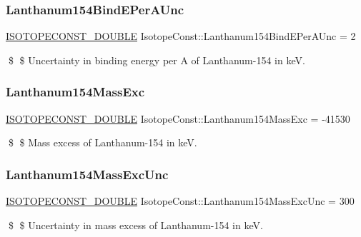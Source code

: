 \subsubsection{\texorpdfstring{Lanthanum154\+Bind\+E\+Per\+A\+Unc}{Lanthanum154BindEPerAUnc}}
{\footnotesize\ttfamily \mbox{\hyperlink{group___isotope_const-_macros_ga8f45a7272ce02c0b4c65c44636ed719a}{I\+S\+O\+T\+O\+P\+E\+C\+O\+N\+S\+T\+\_\+\+D\+O\+U\+B\+LE}} Isotope\+Const\+::\+Lanthanum154\+Bind\+E\+Per\+A\+Unc = 2}

\$ \$ Uncertainty in binding energy per A of Lanthanum-\/154 in keV. \mbox{\label{group___isotope_const-_lanthanum-_la154_ga7b0326944bf7e463cd8969642f48c71a}} 
\subsubsection{\texorpdfstring{Lanthanum154\+Mass\+Exc}{Lanthanum154MassExc}}
{\footnotesize\ttfamily \mbox{\hyperlink{group___isotope_const-_macros_ga8f45a7272ce02c0b4c65c44636ed719a}{I\+S\+O\+T\+O\+P\+E\+C\+O\+N\+S\+T\+\_\+\+D\+O\+U\+B\+LE}} Isotope\+Const\+::\+Lanthanum154\+Mass\+Exc = -\/41530}

\$ \$ Mass excess of Lanthanum-\/154 in keV. \mbox{\label{group___isotope_const-_lanthanum-_la154_gadfd92172bd337bdc3c5e0642476c42e1}} 
\subsubsection{\texorpdfstring{Lanthanum154\+Mass\+Exc\+Unc}{Lanthanum154MassExcUnc}}
{\footnotesize\ttfamily \mbox{\hyperlink{group___isotope_const-_macros_ga8f45a7272ce02c0b4c65c44636ed719a}{I\+S\+O\+T\+O\+P\+E\+C\+O\+N\+S\+T\+\_\+\+D\+O\+U\+B\+LE}} Isotope\+Const\+::\+Lanthanum154\+Mass\+Exc\+Unc = 300}

\$ \$ Uncertainty in mass excess of Lanthanum-\/154 in keV. \mbox{\label{group___isotope_const-_lanthanum-_la154_gae934cd7277df3d00b4731f68c1d491f3}} 
